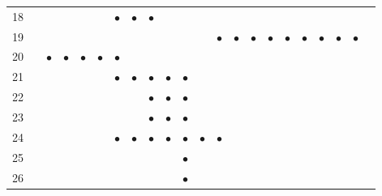 \documentclass[text.tex]{subfiles}
\begin{document}
\begin{table}
\begin{tabular}{l|ccccccccccccccccccccc}
18  &           &           &           &           &           & $\bullet$ & $\bullet$ & $\bullet$ &           &           &           &           &           &           &           &           &           &           &           &           &           \\
19  &           &           &           &           &           &           &           &           &           &           &           & $\bullet$ & $\bullet$ & $\bullet$ & $\bullet$ & $\bullet$ & $\bullet$ & $\bullet$ & $\bullet$ & $\bullet$ &           \\
20  &           & $\bullet$ & $\bullet$ & $\bullet$ & $\bullet$ & $\bullet$ &           &           &           &           &           &           &           &           &           &           &           &           &           &           &           \\
21  &           &           &           &           &           & $\bullet$ & $\bullet$ & $\bullet$ & $\bullet$ & $\bullet$ &           &           &           &           &           &           &           &           &           &           &           \\
22  &           &           &           &           &           &           &           & $\bullet$ & $\bullet$ & $\bullet$ &           &           &           &           &           &           &           &           &           &           &           \\
23  &           &           &           &           &           &           &           & $\bullet$ & $\bullet$ & $\bullet$ &           &           &           &           &           &           &           &           &           &           &           \\
24  &           &           &           &           &           & $\bullet$ & $\bullet$ & $\bullet$ & $\bullet$ & $\bullet$ & $\bullet$ & $\bullet$ &           &           &           &           &           &           &           &           &           \\
25  &           &           &           &           &           &           &           &           &           & $\bullet$ &           &           &           &           &           &           &           &           &           &           &           \\
26  &           &           &           &           &           &           &           &           &           & $\bullet$ &           &           &           &           &           &           &           &           &           &           &           \\

\end{tabular}
\end{table}
\end{document}
